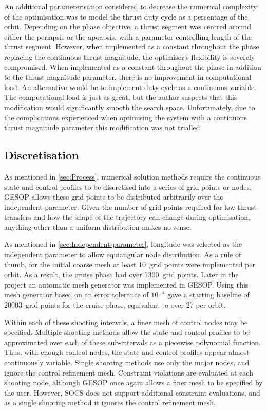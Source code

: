 An additional parameterisation considered to decrease the numerical complexity of the optimisation was to model the thrust duty cycle as a percentage of the orbit. Depending on the phase objective, a thrust segment was centred around either the periapsis or the apoapsis, with a parameter controlling length of the thrust segment. However, when implemented as a constant throughout the phase replacing the continuous thrust magnitude, the optimiser's flexibility is severely compromised. When implemented as a constant throughout the phase in addition to the thrust magnitude parameter, there is no improvement in computational load. An alternative would be to implement duty cycle as a continuous variable. The computational load is just as great, but the author suspects that this modification would significantly smooth the search space. Unfortunately, due to the complications experienced when optimising the system with a continuous thrust magnitude parameter this modification was not trialled.


\subsection{Discretisation} \label{sub:Discretisation}
As mentioned in \autoref{sec:Process}, numerical solution methods require the continuous state and control profiles to be discretised into a series of grid points or nodes. GESOP allows these grid points to be distributed arbitrarily over the independent parameter. Given the number of grid points required for low thrust transfers and how the shape of the trajectory can change during optimisation, anything other than a uniform distribution makes no sense.

As mentioned in \autoref{sec:Independent-parameter}, longitude was selected as the independent parameter to allow equiangular node distribution. As a rule of thumb, for the initial coarse mesh at least 10~grid points were implemented per orbit. As a result, the cruise phase had over 7300~grid points. Later in the project an automatic mesh generator was implemented in GESOP. Using this mesh generator based on an error tolerance of $10^{-4}$ gave a starting baseline of 20003~grid points for the cruise phase, equivalent to over 27 per orbit. 

Within each of these shooting intervals, a finer mesh of control nodes may be specified. Multiple shooting methods allow the state and control profiles to be approximated over each of these sub-intervals as a piecewise polynomial function. Thus, with enough control nodes, the state and control profiles appear almost continuously variable. Single shooting methods use only the major nodes, and ignore the control refinement mesh. Constraint violations are evaluated at each shooting node, although GESOP once again allows a finer mesh to be specified by the user. However, SOCS does not support additional constraint evaluations, and as a single shooting method it ignores the control refinement mesh.

